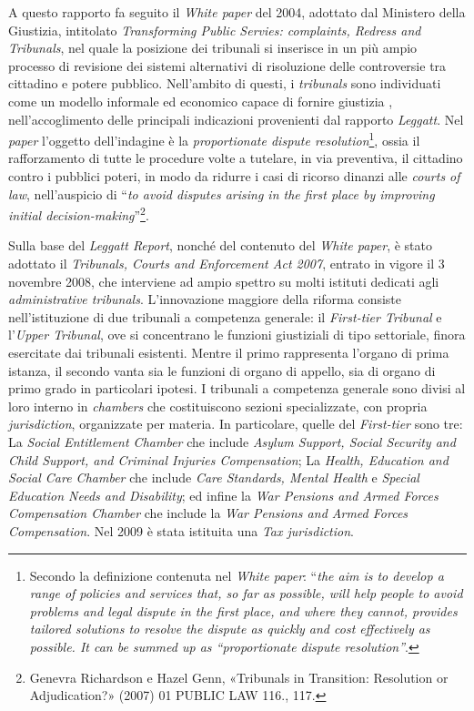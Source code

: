 \documentclass[12pt,it,a4paper,]{report}
\begin{document}
A questo rapporto fa seguito il \emph{White paper} del 2004, adottato
dal Ministero della Giustizia, intitolato \emph{Transforming Public
Servies: complaints, Redress and Tribunals}, nel quale la posizione dei
tribunali si inserisce in un più ampio processo di revisione dei sistemi
alternativi di risoluzione delle controversie tra cittadino e potere
pubblico. Nell'ambito di questi, i \emph{tribunals} sono individuati
come un modello informale ed economico capace di fornire giustizia ,
nell'accoglimento delle principali indicazioni provenienti dal rapporto
\emph{Leggatt}. Nel \emph{paper} l'oggetto dell'indagine è la
\emph{proportionate dispute resolution}\footnote{Secondo la definizione
  contenuta nel \emph{White paper}: ``\emph{the aim is to develop a
  range of policies and services that, so far as possible, will help
  people to avoid problems and legal dispute in the first place, and
  where they cannot, provides tailored solutions to resolve the dispute
  as quickly and cost effectively as possible. It can be summed up as
  ``proportionate dispute resolution''}.}, ossia il rafforzamento di
tutte le procedure volte a tutelare, in via preventiva, il cittadino
contro i pubblici poteri, in modo da ridurre i casi di ricorso dinanzi
alle \emph{courts of law}, nell'auspicio di ``\emph{to avoid disputes
arising in the first place by improving initial
decision-making}''\footnote{{Genevra Richardson e Hazel Genn,
  {«Tribunals in Transition: Resolution or Adjudication?»} (2007) 01
  PUBLIC LAW 116.}, 117.}.

Sulla base del \emph{Leggatt Report}, nonché del contenuto del
\emph{White paper}, è stato adottato il \emph{Tribunals, Courts and
Enforcement Act 2007}, entrato in vigore il 3 novembre 2008, che
interviene ad ampio spettro su molti istituti dedicati agli
\emph{administrative tribunals}. L'innovazione maggiore della riforma
consiste nell'istituzione di due tribunali a competenza generale: il
\emph{First-tier Tribunal} e l'\emph{Upper Tribunal}, ove si concentrano
le funzioni giustiziali di tipo settoriale, finora esercitate dai
tribunali esistenti. Mentre il primo rappresenta l'organo di prima
istanza, il secondo vanta sia le funzioni di organo di appello, sia di
organo di primo grado in particolari ipotesi. I tribunali a competenza
generale sono divisi al loro interno in \emph{chambers} che
costituiscono sezioni specializzate, con propria \emph{jurisdiction},
organizzate per materia. In particolare, quelle del \emph{First-tier}
sono tre: La \emph{Social Entitlement Chamber} che include \emph{Asylum
Support, Social Security and Child Support, and Criminal Injuries
Compensation}; La \emph{Health, Education and Social Care Chamber} che
include \emph{Care Standards, Mental Health} e \emph{Special Education
Needs and Disability}; ed infine la \emph{War Pensions and Armed Forces
Compensation Chamber} che include la \emph{War Pensions and Armed Forces
Compensation}. Nel 2009 è stata istituita una \emph{Tax jurisdiction}.
\end{document}
